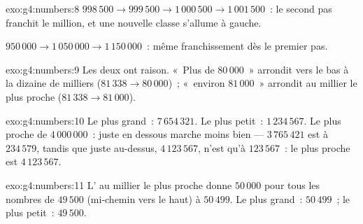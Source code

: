 \begin{solution}{exo:g4:numbers:8}
$998\,500 \to 999\,500 \to 1\,000\,500 \to 1\,001\,500$~: le second
pas franchit le million, et une nouvelle classe s'allume à gauche.

$950\,000 \to 1\,050\,000 \to 1\,150\,000$~: même franchissement dès
le premier pas.
\end{solution}

\begin{solution}{exo:g4:numbers:9}
Les deux ont raison. «~Plus de $80\,000$~» arrondit vers le bas à la
dizaine de milliers ($81\,338 \to 80\,000$)~; «~environ $81\,000$~»
arrondit au millier le plus proche ($81\,338 \to 81\,000$).
\end{solution}

\begin{solution}{exo:g4:numbers:10}
Le plus grand~: $7\,654\,321$. Le plus petit~: $1\,234\,567$. Le
plus proche de $4\,000\,000$~: juste en dessous marche moins bien ---
$3\,765\,421$ est à $234\,579$, tandis que juste au-dessus,
$4\,123\,567$, n'est qu'à $123\,567$~: le plus proche est
$4\,123\,567$.
\end{solution}

\begin{solution}{exo:g4:numbers:11}
L' au millier le plus proche donne $50\,000$ pour tous les
nombres de $49\,500$ (mi-chemin  vers le haut) à $50\,499$.
Le plus grand~: $50\,499$~; le plus petit~: $49\,500$.
\end{solution}
